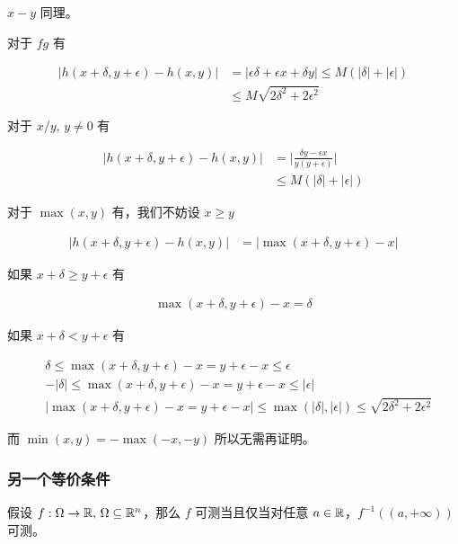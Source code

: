 $x-y$ 同理。

对于 $fg$ 有

\begin{align*}
\lvert h(x+\delta, y+\epsilon) - h(x,y) \rvert &= \lvert \epsilon\delta + \epsilon x  + \delta y\rvert \le M(\lvert \delta \rvert + \lvert \epsilon \rvert) \\
& \le M\sqrt{2\delta^2 + 2\epsilon^2}
\end{align*}


对于 $x/y,\, y \ne 0$ 有

\begin{align*}
\lvert h(x+\delta, y+\epsilon) - h(x,y) \rvert &= \lvert \frac{\delta y - \epsilon x }{y(y+\epsilon)}\rvert  \\
& \le M(\lvert \delta \rvert + \lvert \epsilon \rvert)
\end{align*}

对于 $\max(x,y)$ 有，我们不妨设 $x \ge y$

\begin{align*}
\lvert h(x+\delta, y+\epsilon) - h(x,y) \rvert &= \lvert \max(x+\delta, y+\epsilon) - x\rvert 
\end{align*}

如果 $x+\delta \ge y + \epsilon$ 有


\begin{align*}
\max(x+\delta, y+\epsilon) - x = \delta
\end{align*}

如果 $x+\delta < y + \epsilon$ 有

\begin{align*}
&\delta \le \max(x+\delta, y+\epsilon) - x = y + \epsilon - x \le \epsilon \\
& - \lvert \delta \rvert \le \max(x+\delta, y+\epsilon) - x = y + \epsilon - x \le \lvert \epsilon \rvert \\
& \lvert\max(x+\delta, y+\epsilon) - x = y + \epsilon - x \rvert \le \max(\lvert \delta \rvert, \lvert \epsilon \rvert) \le \sqrt{2\delta^2 + 2\epsilon^2}
\end{align*}


而 $\min(x,y) = - \max(-x, -y)$ 所以无需再证明。

\subsubsection{另一个等价条件}

假设 $f: \Omega \to \mathbb{R},\, \Omega \subseteq \mathbb{R}^n$，那么 $f$ 可测当且仅当对任意 $a \in \mathbb{R}$，$f^{-1}((a, +\infty))$ 可测。

